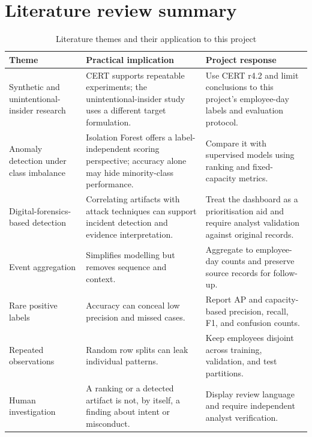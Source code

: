 \section{Literature review summary}
\begin{table}[H]
\centering
\tablefont
\caption{Literature themes and their application to this project}
\label{tab:literature-themes}
\begin{tabularx}{\textwidth}{|p{}|p{}|Y|}
\hline
\textbf{Theme} & \textbf{Practical implication} & \textbf{Project response}\\\hline
Synthetic and unintentional-insider research & CERT supports repeatable experiments; the unintentional-insider study uses a different target formulation. & Use CERT r4.2 and limit conclusions to this project's employee-day labels and evaluation protocol.\\\hline
Anomaly detection under class imbalance & Isolation Forest offers a label-independent scoring perspective; accuracy alone may hide minority-class performance. & Compare it with supervised models using ranking and fixed-capacity metrics.\\\hline
Digital-forensics-based detection & Correlating artifacts with attack techniques can support incident detection and evidence interpretation. & Treat the dashboard as a prioritisation aid and require analyst validation against original records.\\\hline
Event aggregation & Simplifies modelling but removes sequence and context. & Aggregate to employee-day counts and preserve source records for follow-up.\\\hline
Rare positive labels & Accuracy can conceal low precision and missed cases. & Report AP and capacity-based precision, recall, F1, and confusion counts.\\\hline
Repeated observations & Random row splits can leak individual patterns. & Keep employees disjoint across training, validation, and test partitions.\\\hline
Human investigation & A ranking or a detected artifact is not, by itself, a finding about intent or misconduct. & Display review language and require independent analyst verification.\\\hline
\end{tabularx}
\end{table}

